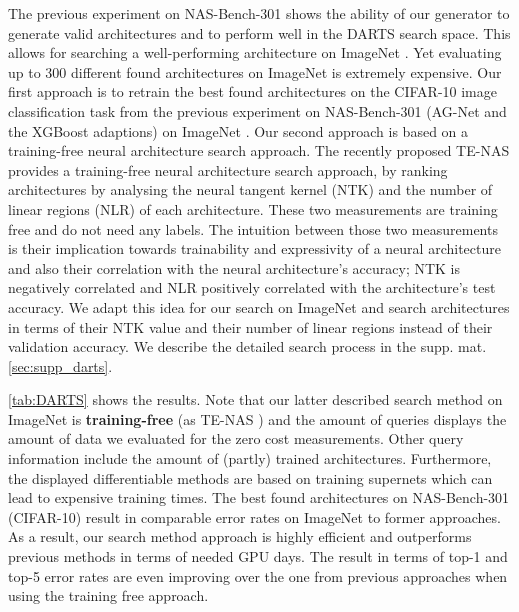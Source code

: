 \documentclass[runningheads]{llncs}
\begin{document}
The previous experiment on NAS-Bench-301 \cite{2020NB301} shows the ability of our generator to generate valid architectures and to perform well in the DARTS \cite{2018DARTS} search space. This 
allows for searching a well-performing architecture on ImageNet \cite{2009ImageNet}. Yet evaluating up to 300 different found architectures on ImageNet is extremely expensive. Our first approach is to retrain the best found architectures on the CIFAR-10 \cite{2009CIFAR} image classification task from the previous experiment on NAS-Bench-301 (AG-Net and the XGBoost adaptions) on ImageNet \cite{2009ImageNet}. Our second approach is based on a training-free neural architecture search approach. The recently proposed TE-NAS \cite{2021Im4GPU} provides a training-free neural architecture search approach, by ranking architectures by analysing the neural tangent kernel (NTK) and the number of linear regions (NLR) of each architecture. These two measurements are training free and do not need any labels. The intuition between those two measurements is their implication towards trainability and expressivity of a neural architecture and also their correlation with the neural architecture's accuracy; NTK is negatively correlated and NLR positively correlated with the architecture's test accuracy. We adapt this idea for our search on ImageNet and search architectures in terms of their NTK value and their number of linear regions instead of their validation accuracy. We describe the detailed search process in the supp. mat. \autoref{sec:supp_darts}.


\autoref{tab:DARTS} shows the results.
Note that our latter described search method on ImageNet is \textbf{training-free} (as TE-NAS \cite{2021Im4GPU}) and the amount of queries displays the amount of data we evaluated for the zero cost measurements. Other query information include the amount of (partly) trained architectures. 
Furthermore, the displayed differentiable methods are based on training supernets which can lead to expensive training times.  The best found architectures on NAS-Bench-301 \cite{2020NB301} (CIFAR-10) result in comparable error rates on ImageNet to former approaches.
As a result, our search method approach is highly efficient and outperforms previous methods in terms of needed GPU days. 
The result in terms of top-1 and top-5 error rates are even improving over the one from previous approaches when using the training free approach.
\end{document}
